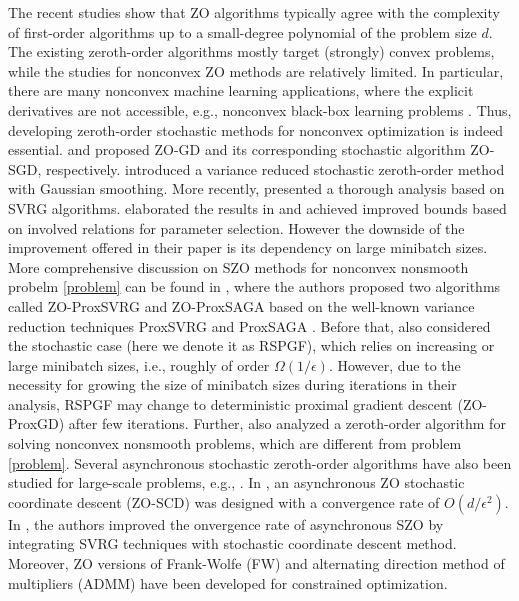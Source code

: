 The recent studies show that ZO algorithms typically agree with the complexity of first-order algorithms up to a small-degree polynomial of the problem size $d$. The existing zeroth-order algorithms mostly target (strongly) convex problems, while the studies for nonconvex ZO methods are relatively limited. In particular, there are many nonconvex machine learning applications, where the explicit derivatives are not accessible, e.g., nonconvex black-box learning problems \cite{chen2017zoo,liu2018zeroth}. Thus, developing zeroth-order stochastic methods for nonconvex optimization is indeed essential.
\cite{ghadimi2013stochastic} and \cite{nesterov2011random} proposed ZO-GD and its corresponding stochastic algorithm ZO-SGD, respectively. \cite{liu2018stochastic} introduced a variance reduced stochastic zeroth-order method with  Gaussian smoothing. More recently, \cite{liu2018zeroth} presented a thorough analysis based on SVRG algorithms. \cite{ji2019improved} elaborated the results in \cite{liu2018zeroth} and achieved improved bounds based on involved relations for parameter selection. However the downside of the improvement offered in their paper is its dependency on large minibatch sizes. More comprehensive discussion on SZO methods for nonconvex nonsmooth probelm \eqref{problem} can be found in \cite{huang2019faster}, where the authors proposed two algorithms called ZO-ProxSVRG and ZO-ProxSAGA based on the well-known variance reduction techniques ProxSVRG and ProxSAGA \cite{reddi2016proximal}. Before that,  \cite{ghadimi2016accelerated} also considered the stochastic case (here we denote
it as RSPGF), which relies on increasing or large minibatch sizes, i.e., roughly of order $\Omega(1/\epsilon)$. However,  due to the necessity for growing the size of minibatch sizes during iterations in their analysis, RSPGF may change to deterministic proximal gradient descent (ZO-ProxGD) after few iterations. Further, \cite{liu2018stochastic} also analyzed a zeroth-order algorithm for solving nonconvex nonsmooth problems, which are different from problem \eqref{problem}. Several asynchronous stochastic zeroth-order algorithms have also been studied for large-scale problems, e.g., \cite{gu2018inexact,lian2016comprehensive,gu2018faster}.
In \cite{lian2016comprehensive}, an asynchronous ZO stochastic coordinate
descent (ZO-SCD) was designed with a convergence rate of $O(d/\epsilon^2)$. In \cite{gu2018faster}, the authors improved the onvergence rate of asynchronous SZO by integrating SVRG techniques with stochastic coordinate descent method. Moreover, ZO versions of Frank-Wolfe
(FW) \cite{balasubramanian2018zeroth,sahu2018towards} and alternating direction method of multipliers (ADMM) \cite{liu2017zeroth,chen2019zo} have been developed for constrained optimization.
  
